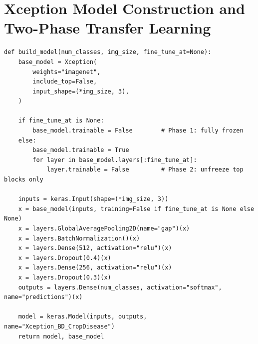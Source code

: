 \documentclass[12pt,a4paper,oneside]{report}
\begin{document}
\section{Xception Model Construction and Two-Phase Transfer Learning}
\begin{lstlisting}[caption={Model construction with configurable backbone freezing for two-phase transfer learning.}]
def build_model(num_classes, img_size, fine_tune_at=None):
    base_model = Xception(
        weights="imagenet",
        include_top=False,
        input_shape=(*img_size, 3),
    )

    if fine_tune_at is None:
        base_model.trainable = False        # Phase 1: fully frozen
    else:
        base_model.trainable = True
        for layer in base_model.layers[:fine_tune_at]:
            layer.trainable = False         # Phase 2: unfreeze top blocks only

    inputs = keras.Input(shape=(*img_size, 3))
    x = base_model(inputs, training=False if fine_tune_at is None else None)
    x = layers.GlobalAveragePooling2D(name="gap")(x)
    x = layers.BatchNormalization()(x)
    x = layers.Dense(512, activation="relu")(x)
    x = layers.Dropout(0.4)(x)
    x = layers.Dense(256, activation="relu")(x)
    x = layers.Dropout(0.3)(x)
    outputs = layers.Dense(num_classes, activation="softmax", name="predictions")(x)

    model = keras.Model(inputs, outputs, name="Xception_BD_CropDisease")
    return model, base_model
\end{lstlisting}
\end{document}
